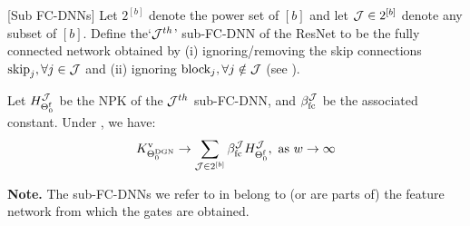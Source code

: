 \begin{definition}\label{def:subfcdnn}[Sub FC-DNNs]
Let $2^{[b]}$ denote the power set of $[b]$ and let $\mathcal{J}\in 2^{[b]}$ denote any subset of $[b]$. Define the`$\mathcal{J}^{th}$' sub-FC-DNN of the ResNet to be the fully connected network obtained by (i) ignoring/removing the skip connections $\text{skip}_j,\forall j\in \mathcal{J}$  and (ii) ignoring $\text{block}_{j},\forall j\notin \mathcal{J}$ (see ).
\end{definition}
\begin{theorem}\label{th:mainres} Let $H^{\mathcal{J}}_{\Theta^{\textrm{f}}_0}$ be the NPK of the $\mathcal{J}^{th}$ sub-FC-DNN, and $\beta_{\text{fc}}^{\mathcal{J}}$ be the associated constant. Under , we have:
\begin{align*}
K^{\text{v}}_{\Theta^{\text{DGN}}_0}\rightarrow \sum_{\mathcal{J}\in 2^{[b]}}  \beta_{\text{fc}}^{\mathcal{J}} H^{\mathcal{J}}_{\Theta^{\textrm{f}}_0}, \,\, \text{as}\,\,  w\rightarrow\infty
\end{align*}
\end{theorem}
\textbf{Note.} The sub-FC-DNNs we refer to in  belong to (or are parts of) the feature network from which the gates are obtained. 
